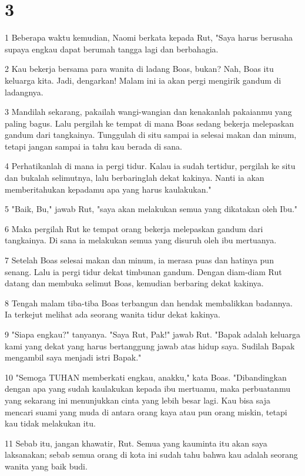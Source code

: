 \chapter{3}

\par 1 Beberapa waktu kemudian, Naomi berkata kepada Rut, "Saya harus berusaha supaya engkau dapat berumah tangga lagi dan berbahagia.
\par 2 Kau bekerja bersama para wanita di ladang Boas, bukan? Nah, Boas itu keluarga kita. Jadi, dengarkan! Malam ini ia akan pergi mengirik gandum di ladangnya.
\par 3 Mandilah sekarang, pakailah wangi-wangian dan kenakanlah pakaianmu yang paling bagus. Lalu pergilah ke tempat di mana Boas sedang bekerja melepaskan gandum dari tangkainya. Tunggulah di situ sampai ia selesai makan dan minum, tetapi jangan sampai ia tahu kau berada di sana.
\par 4 Perhatikanlah di mana ia pergi tidur. Kalau ia sudah tertidur, pergilah ke situ dan bukalah selimutnya, lalu berbaringlah dekat kakinya. Nanti ia akan memberitahukan kepadamu apa yang harus kaulakukan."
\par 5 "Baik, Bu," jawab Rut, "saya akan melakukan semua yang dikatakan oleh Ibu."
\par 6 Maka pergilah Rut ke tempat orang bekerja melepaskan gandum dari tangkainya. Di sana ia melakukan semua yang disuruh oleh ibu mertuanya.
\par 7 Setelah Boas selesai makan dan minum, ia merasa puas dan hatinya pun senang. Lalu ia pergi tidur dekat timbunan gandum. Dengan diam-diam Rut datang dan membuka selimut Boas, kemudian berbaring dekat kakinya.
\par 8 Tengah malam tiba-tiba Boas terbangun dan hendak membalikkan badannya. Ia terkejut melihat ada seorang wanita tidur dekat kakinya.
\par 9 "Siapa engkau?" tanyanya. "Saya Rut, Pak!" jawab Rut. "Bapak adalah keluarga kami yang dekat yang harus bertanggung jawab atas hidup saya. Sudilah Bapak mengambil saya menjadi istri Bapak."
\par 10 "Semoga TUHAN memberkati engkau, anakku," kata Boas. "Dibandingkan dengan apa yang sudah kaulakukan kepada ibu mertuamu, maka perbuatanmu yang sekarang ini menunjukkan cinta yang lebih besar lagi. Kau bisa saja mencari suami yang muda di antara orang kaya atau pun orang miskin, tetapi kau tidak melakukan itu.
\par 11 Sebab itu, jangan khawatir, Rut. Semua yang kauminta itu akan saya laksanakan; sebab semua orang di kota ini sudah tahu bahwa kau adalah seorang wanita yang baik budi.
